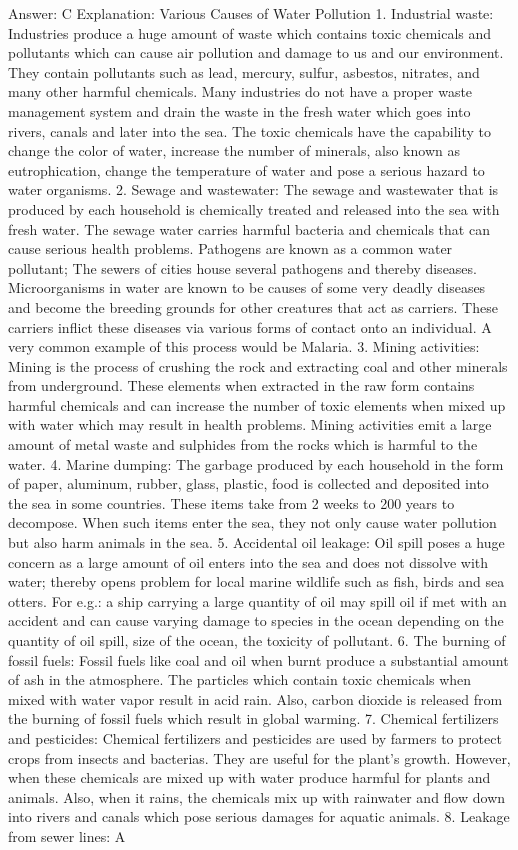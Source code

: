 Answer: C
Explanation: Various Causes of Water Pollution 1. Industrial waste: Industries produce a huge amount of waste which contains toxic chemicals and pollutants which can cause air pollution and damage to us and our environment. They contain pollutants such as lead, mercury, sulfur, asbestos, nitrates, and many other harmful chemicals. Many industries do not have a proper waste management system and drain the waste in the fresh water which goes into rivers, canals and later into the sea. The toxic chemicals have the capability to change the color of water, increase the number of minerals, also known as eutrophication, change the temperature of water and pose a serious hazard to water organisms. 2. Sewage and wastewater: The sewage and wastewater that is produced by each household is chemically treated and released into the sea with fresh water. The sewage water carries harmful bacteria and chemicals that can cause serious health problems. Pathogens are known as a common water pollutant; The sewers of cities house several pathogens and thereby diseases. Microorganisms in water are known to be causes of some very deadly diseases and become the breeding grounds for other creatures that act as carriers. These carriers inflict these diseases via various forms of contact onto an individual. A very common example of this process would be Malaria. 3. Mining activities: Mining is the process of crushing the rock and extracting coal and other minerals from underground. These elements when extracted in the raw form contains harmful chemicals and can increase the number of toxic elements when mixed up with water which may result in health problems. Mining activities emit a large amount of metal waste and sulphides from the rocks which is harmful to the water. 4. Marine dumping: The garbage produced by each household in the form of paper, aluminum, rubber, glass, plastic, food is collected and deposited into the sea in some countries. These items take from 2 weeks to 200 years to decompose. When such items enter the sea, they not only cause water pollution but also harm animals in the sea. 5. Accidental oil leakage: Oil spill poses a huge concern as a large amount of oil enters into the sea and does not dissolve with water; thereby opens problem for local marine wildlife such as fish, birds and sea otters. For e.g.: a ship carrying a large quantity of oil may spill oil if met with an accident and can cause varying damage to species in the ocean depending on the quantity of oil spill, size of the ocean, the toxicity of pollutant. 6. The burning of fossil fuels: Fossil fuels like coal and oil when burnt produce a substantial amount of ash in the atmosphere. The particles which contain toxic chemicals when mixed with water vapor result in acid rain. Also, carbon dioxide is released from the burning of fossil fuels which result in global warming. 7. Chemical fertilizers and pesticides: Chemical fertilizers and pesticides are used by farmers to protect crops from insects and bacterias. They are useful for the plant’s growth. However, when these chemicals are mixed up with water produce harmful for plants and animals. Also, when it rains, the chemicals mix up with rainwater and flow down into rivers and canals which pose serious damages for aquatic animals. 8. Leakage from sewer lines: A 